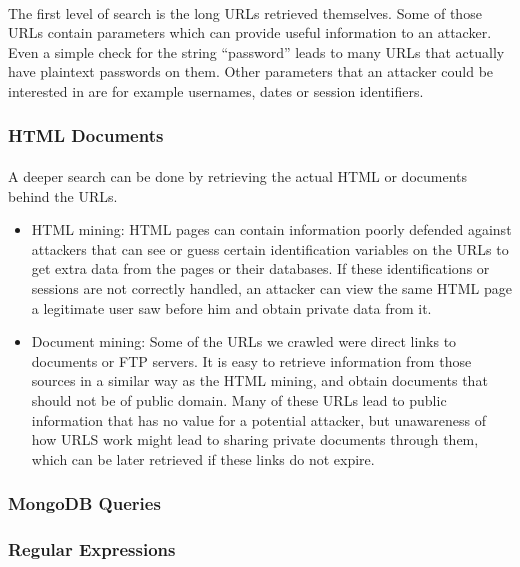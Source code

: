 \documentclass[12pt]{article}
\begin{document}
\paragraph{}
The first level of search is the long URLs retrieved themselves. Some of those URLs contain parameters which can provide useful information to an attacker. Even a simple check for the string “password” leads to many URLs that actually have plaintext passwords on them. Other parameters that an attacker could be interested in are for example usernames, dates or session identifiers.

\subsubsection{HTML Documents}

\paragraph{}
A deeper search can be done by retrieving the actual HTML or documents behind the URLs.

\begin{itemize}

\item  HTML mining: HTML pages can contain information poorly defended against attackers that can see or guess certain identification variables on the URLs to get extra data from the pages or their databases. If these identifications or sessions are not correctly handled, an attacker can view the same HTML page a legitimate user saw before him and obtain private data from it.

\item  Document mining: Some of the URLs we crawled were direct links to documents or FTP servers. It is easy to retrieve information from those sources in a similar way as the HTML mining, and obtain documents that should not be of public domain. Many of these URLs lead to public information that has no value for a potential attacker, but unawareness of how URLS work might lead to sharing private documents through them, which can be later retrieved if these links do not expire.

\end{itemize}

\subsubsection{MongoDB Queries}

\subsubsection{Regular Expressions}
\end{document}
